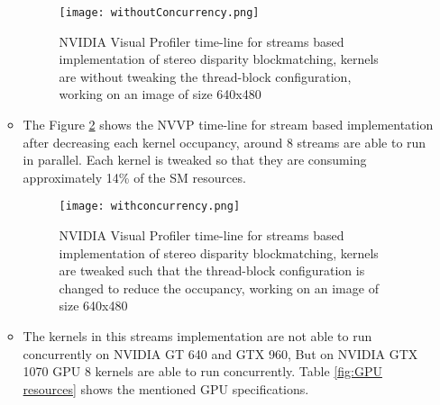 \begin{itemize}
\begin{itemize}
		\begin{figure}[htb]
			\centering
			\texttt{[image: withoutConcurrency.png]}
			\caption{NVIDIA Visual Profiler time-line for streams based implementation of stereo disparity blockmatching, kernels are without tweaking the thread-block configuration, working on an image of size 640x480}
			\label{fig:full occupancy}
		\end{figure}
		\item The Figure \ref{fig:reduced occupancy} shows the NVVP time-line for stream based implementation after decreasing each kernel occupancy,  around 8 streams are able to run in parallel. Each kernel is tweaked so that they are consuming approximately 14\% of the SM resources.
		\begin{figure}[htb]
			\centering
			\texttt{[image: withconcurrency.png]}
			\caption{NVIDIA Visual Profiler time-line for streams based implementation of stereo disparity blockmatching, kernels are tweaked such that the thread-block configuration is changed to reduce the occupancy, working on an image of size 640x480}
			\label{fig:reduced occupancy}
		\end{figure}
		\item The kernels in this streams implementation are not able to run concurrently on NVIDIA GT 640 and GTX 960, But on NVIDIA GTX 1070 GPU 8 kernels are able to run concurrently. Table \ref{fig:GPU resources} shows the mentioned GPU specifications.	
			\begin{table}[htb]
				\centering
				\caption{Hardware resources of different GPUs used for stereo disparity block matching}%
				\label{fig:GPU resources}
			\end{table}
	\end{itemize}
\end{itemize}
